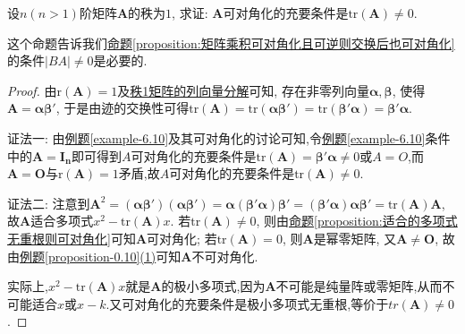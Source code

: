 \documentclass[../../main.tex]{subfiles}%
\begin{document}
\begin{proposition}\label{proposition:矩阵可对角化迹必不为零}
设\(n(n > 1)\)阶矩阵\(\boldsymbol{A}\)的秩为\(1\), 求证: \(\boldsymbol{A}\)可对角化的充要条件是\(\mathrm{tr}(\boldsymbol{A})\neq 0\).
\end{proposition}
\begin{note}
这个命题告诉我们\hyperref[proposition:矩阵乘积可对角化且可逆则交换后也可对角化]{命题\ref{proposition:矩阵乘积可对角化且可逆则交换后也可对角化}}的条件$|BA|\ne 0$是必要的.
\end{note}
\begin{proof}
由\(\mathrm{r}(\boldsymbol{A}) = 1\)及\hyperref[lemma:秩1矩阵的列向量分解]{秩1矩阵的列向量分解}可知, 存在非零列向量\(\boldsymbol{\alpha},\boldsymbol{\beta}\), 使得\(\boldsymbol{A} = \boldsymbol{\alpha}\boldsymbol{\beta}'\), 于是由迹的交换性可得\(\mathrm{tr}(\boldsymbol{A}) = \mathrm{tr}(\boldsymbol{\alpha}\boldsymbol{\beta}') = \mathrm{tr}(\boldsymbol{\beta}'\boldsymbol{\alpha}) = \boldsymbol{\beta}'\boldsymbol{\alpha}\).

{\color{blue}证法一:}
由\hyperref[example-6.10]{例题\ref{example-6.10}}及其可对角化的讨论可知,令\hyperref[example-6.10]{例题\ref{example-6.10}}条件中的$\boldsymbol{A}=\boldsymbol{I_n}$即可得到$A$可对角化的充要条件是$\mathrm{tr}(\boldsymbol{A})=\boldsymbol{\beta}'\boldsymbol{\alpha}\ne 0$或$A=O$,而$\boldsymbol{A}=\boldsymbol{O}$与$\mathrm{r}(\boldsymbol{A}) = 1$矛盾,故$A$可对角化的充要条件是$\mathrm{tr}(\boldsymbol{A})\ne 0$.

{\color{blue}证法二:}
注意到\(\boldsymbol{A}^2 = (\boldsymbol{\alpha}\boldsymbol{\beta}')(\boldsymbol{\alpha}\boldsymbol{\beta}') = \boldsymbol{\alpha}(\boldsymbol{\beta}'\boldsymbol{\alpha})\boldsymbol{\beta}' = (\boldsymbol{\beta}'\boldsymbol{\alpha})\boldsymbol{\alpha}\boldsymbol{\beta}' = \mathrm{tr}(\boldsymbol{A})\boldsymbol{A}\), 故\(\boldsymbol{A}\)适合多项式\(x^2-\mathrm{tr}(\boldsymbol{A})x\). 若\(\mathrm{tr}(\boldsymbol{A})\neq 0\), 则由\hyperref[proposition:适合的多项式无重根则可对角化]{命题\ref{proposition:适合的多项式无重根则可对角化}}可知\(\boldsymbol{A}\)可对角化; 若\(\mathrm{tr}(\boldsymbol{A}) = 0\), 则\(\boldsymbol{A}\)是幂零矩阵, 又\(\boldsymbol{A}\neq \boldsymbol{O}\), 故由\hyperref[proposition-0.10]{例题\ref{proposition-0.10}(1)}可知\(\boldsymbol{A}\)不可对角化.

实际上,$x^2-\mathrm{tr}(\boldsymbol{A})x$就是$\boldsymbol{A}$的极小多项式,因为$\boldsymbol{A}$不可能是纯量阵或零矩阵,从而不可能适合$x$或$x-k$.又可对角化的充要条件是极小多项式无重根,等价于${tr}(\boldsymbol{A})\ne 0$.
\end{proof}
\end{document}
